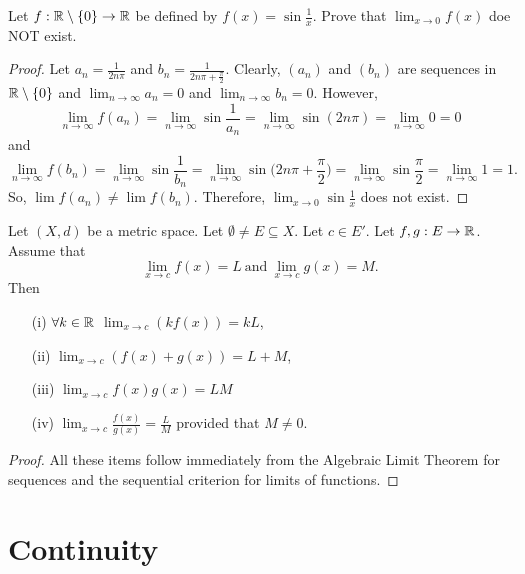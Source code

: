 \documentclass[a4paper]{article}
\begin{document}
\begin{eg}
    Let \( f: \mathbb{R} \setminus \{  0 \} \to \mathbb{R}  \) be defined by \( f(x) = \sin \frac{ 1 }{ x }  \). Prove that \( \lim_{ x \to 0 } f(x) \) doe NOT exist.
\end{eg}
\begin{proof}
Let \( {a}_{n} = \frac{ 1 }{ 2n \pi }  \) and \( {b}_{n} = \frac{ 1 }{ 2n \pi + \frac{ \pi }{ 2 }  }  \). Clearly, \( ({a}_{n}) \) and \( ({b}_{n}) \) are sequences in \( \mathbb{R} \setminus \{ 0 \}  \) and \( \lim_{ n \to \infty  }  {a}_{n} = 0  \) and \( \lim_{ n \to \infty  }  {b}_{n} = 0 \). However,
\[ \lim_{ n \to \infty  }  f({a}_{n}) = \lim_{ n \to \infty  }  \sin \frac{ 1 }{ {a}_{n} }  = \lim_{ n \to \infty  }  \sin (2n \pi) = \lim_{ n \to \infty  } 0 = 0   \]
and
\[  \lim_{ n \to \infty  } f({b}_{n}) = \lim_{ n \to \infty  } \sin \frac{ 1 }{ {b}_{n} } = \lim_{ n \to \infty  }  \sin \Big(2n\pi + \frac{ \pi }{ 2 }  \Big) = \lim_{ n \to \infty  }  \sin \frac{ \pi }{ 2 }  = \lim_{ n \to \infty  } 1 = 1. \]
So, \( \lim f({a}_{n}) \neq \lim f({b}_{n}) \). Therefore, \( \lim_{ x \to 0 }  \sin \frac{ 1 }{ x }  \) does not exist.
\end{proof}

\begin{theorem}[ ]
    Let \( (X,d) \) be a metric space. Let \( \emptyset \neq E \subseteq  X \). Let \( c \in E' \). Let \( f,g: E \to \mathbb{R}  \). Assume that 
    \[  \lim_{ x \to c } f(x) = L \ \text{and} \ \lim_{ x \to c }  g(x) = M. \]
    Then
    \begin{enumerate}
        \item[(i)] \( \forall k \in \mathbb{R}  \) \( \lim_{ x \to c } (kf(x)) =  kL \),
        \item[(ii)] \( \lim_{ x \to c } (f(x) + g(x))  = L + M\),
        \item[(iii)] \( \lim_{ x \to c } f(x)g(x) = LM \)
        \item[(iv)] \( \lim_{ x \to c } \frac{ f(x) }{ g(x) }  = \frac{ L }{ M }  \) provided that \( M \neq 0 \).
    \end{enumerate}
\end{theorem}
\begin{proof}
All these items follow immediately from the Algebraic Limit Theorem for sequences and the sequential criterion for limits of functions.
\end{proof}

\section{Continuity}
\end{document}
